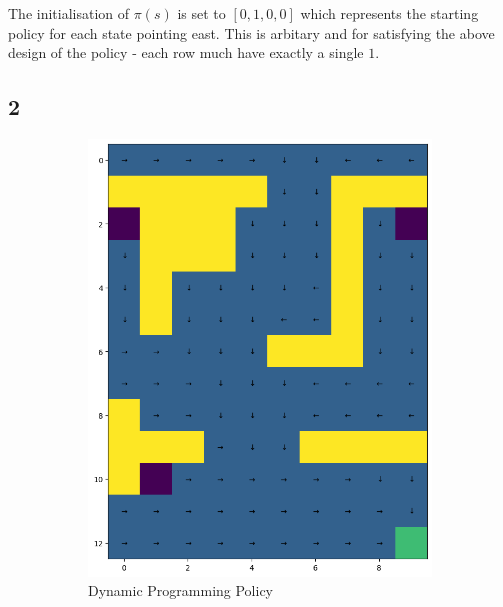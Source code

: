 The initialisation of $\pi(s)$ is set to $[0,1,0,0]$ which 
represents the starting policy for each state pointing east.
This is arbitary and for satisfying the above design of the 
policy - each row much have exactly a single $1$. 


\subsection*{2}
\begin{figure}[H]
    \centering
    \begin{subfigure}[b]{0.4\textwidth}
        \centering
        \includegraphics[width=\textwidth]{assets/dp/dp_optimal_policy.png}        
        \caption{Dynamic Programming Policy}
    \end{subfigure}
    \hfill 
    \begin{subfigure}[b]{0.4\textwidth}
        \centering

\end{subfigure}
\end{figure}
